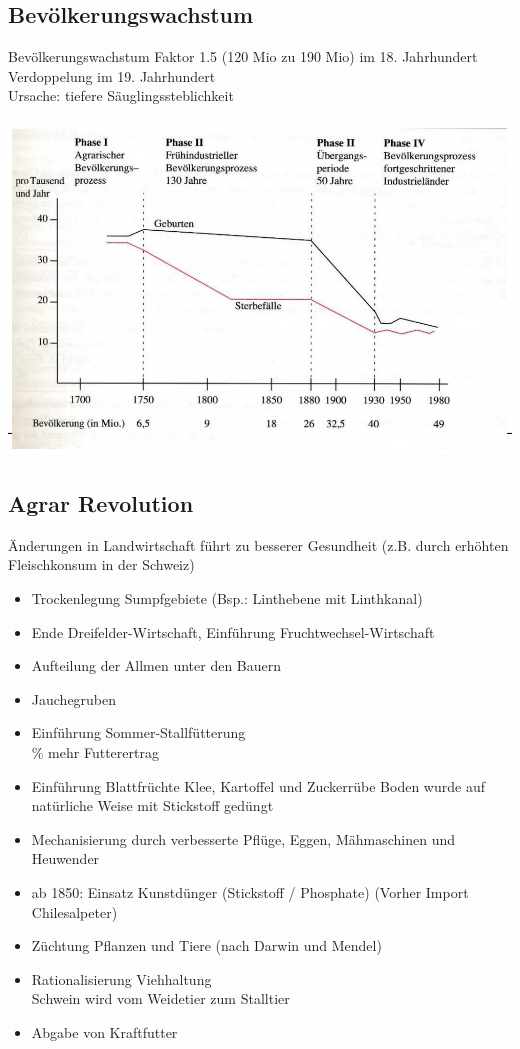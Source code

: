 \documentclass{report}
\begin{document}
\subsection{Bevölkerungswachstum}
Bevölkerungswachstum Faktor 1.5 (120 Mio zu 190 Mio) im 18. Jahrhundert\\
Verdoppelung im 19. Jahrhundert\\
Ursache: tiefere Säuglingssteblichkeit\\\\
\includegraphics[width=\textwidth]{images/geburtenrate.png}
\newpage

\subsection{Agrar Revolution}
Änderungen in Landwirtschaft führt zu besserer Gesundheit (z.B. durch erhöhten Fleischkonsum in der Schweiz)
\begin{itemize}
	\item Trockenlegung Sumpfgebiete (Bsp.: Linthebene mit Linthkanal)
	\item Ende Dreifelder-Wirtschaft, Einführung Fruchtwechsel-Wirtschaft
	\item Aufteilung der Allmen unter den Bauern
	\item Jauchegruben
	\item Einführung Sommer-Stallfütterung\\
		\% mehr Futterertrag
	\item Einführung Blattfrüchte Klee, Kartoffel und Zuckerrübe
		\arrow Boden wurde auf natürliche Weise mit Stickstoff gedüngt
	\item Mechanisierung durch verbesserte Pflüge, Eggen, Mähmaschinen und Heuwender
	\item ab 1850: Einsatz Kunstdünger (Stickstoff / Phosphate) (Vorher Import Chilesalpeter)
	\item Züchtung Pflanzen und Tiere (nach Darwin und Mendel)
	\item Rationalisierung Viehhaltung\\
		\arrow Schwein wird vom Weidetier zum Stalltier
	\item Abgabe von Kraftfutter
\end{itemize}
\end{document}
